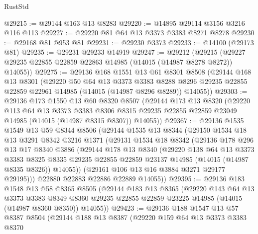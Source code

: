 \begin{lexlean}{RustStd}
\begin{coremodule}
@29215 := @29144 @163 @13 @8283
@29220 := @14895 @29114 @3156 @3216 @116 @113
@29227 := @29220 @81 @64 @13 @3373 @3383 @8271 @8278
@29230 := @29168 @81 @953 @81
@29231 := @29230 @3373
@29233 := @14100 (@29173 @81)
@29235 := @29231 @29233 @14919
@29247 := @29212
    (@29215 (@29227 @29235 @22855 @22859 @22863 @14985 (@14015 (@14987 @8278 @8272)) @14055))
@29275 := @29136
    @168
    @1551
    @13
    @61
    @8301
    @8508
    (@29144
      @168
      @13
      @8301
      (@29220
        @50
        @64
        @13
        @3373
        @3383
        @8288
        @8296
        @29235
        @22855
        @22859
        @22961
        @14985
        (@14015 (@14987 @8296 @8289))
        @14055))
@29303 := @29136
    @173
    @1550
    @13
    @60
    @8320
    @8507
    (@29144
      @173
      @13
      @8320
      (@29220
        @113
        @64
        @13
        @3373
        @3383
        @8306
        @8315
        @29235
        @22855
        @22859
        @23049
        @14985
        (@14015 (@14987 @8315 @8307))
        @14055))
@29367 := @29136
    @1535
    @1549
    @13
    @59
    @8344
    @8506
    (@29144
      @1535
      @13
      @8344
      (@29150
        @1534
        @18
        @13
        @3291
        @8342
        @3216
        @1371
        (@29131
          @1534
          @18
          @8342
          (@29136
            @178
            @296
            @13
            @17
            @8340
            @3886
            (@29144
              @178
              @13
              @8340
              (@29220
                @138
                @64
                @13
                @3373
                @3383
                @8325
                @8335
                @29235
                @22855
                @22859
                @23137
                @14985
                (@14015 (@14987 @8335 @8326))
                @14055))
            (@29161 @106 @13 @16 @3884 @3271 @29177 @29195)))
        @22880
        @22883
        @22886
        @22889
        @14055))
@29395 := @29136
    @183
    @1548
    @13
    @58
    @8365
    @8505
    (@29144
      @183
      @13
      @8365
      (@29220
        @143
        @64
        @13
        @3373
        @3383
        @8349
        @8360
        @29235
        @22855
        @22859
        @23225
        @14985
        (@14015 (@14987 @8360 @8350))
        @14055))
@29423 := @29136
    @188
    @1547
    @13
    @57
    @8387
    @8504
    (@29144
      @188
      @13
      @8387
      (@29220
        @159
        @64
        @13
        @3373
        @3383
        @8370

\end{coremodule}
\end{lexlean}

